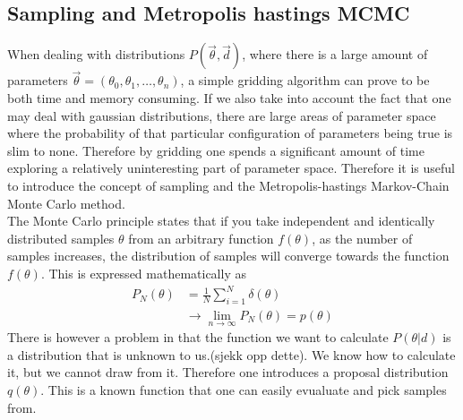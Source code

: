 \subsection{Sampling and Metropolis hastings MCMC}
When dealing with distributions $P(\vec{\theta},\vec{d})$, where there is a
large amount of parameters $\vec{\theta}=(\theta_0, \theta_1,\dots, \theta_n)$,
a simple gridding algorithm can prove to be both time and memory consuming. If
we also take into account the fact that one may deal with gaussian
distributions, there are large areas of parameter space where the probability of
that particular configuration of parameters being true is slim to none.
Therefore by gridding one spends a significant amount of time exploring a relatively
uninteresting part of parameter space. Therefore it is useful to introduce the
concept of sampling and the Metropolis-hastings Markov-Chain Monte Carlo
method.\\

The Monte Carlo principle states that if you take
independent and identically distributed samples $\theta$ from an arbitrary
function $f(\theta)$, as the number of samples increases, the distribution of
samples will converge towards the function $f(\theta)$. This is expressed
mathematically as
\begin{align}
    P_N(\theta) &= \frac{1}{N}\sum_{i=1}^N\delta(\theta)\\
    &\rightarrow \lim_{n\to\infty}P_N(\theta)=p(\theta)
\end{align}
There is however a problem in that the function we want to calculate
$P(\theta\vert d)$ is a distribution that is unknown to us.(sjekk opp dette). We
know how to calculate it, but we cannot draw from it. Therefore one introduces a
proposal distribution $q(\theta)$. This is a known function that one can easily
evualuate and pick samples from.

